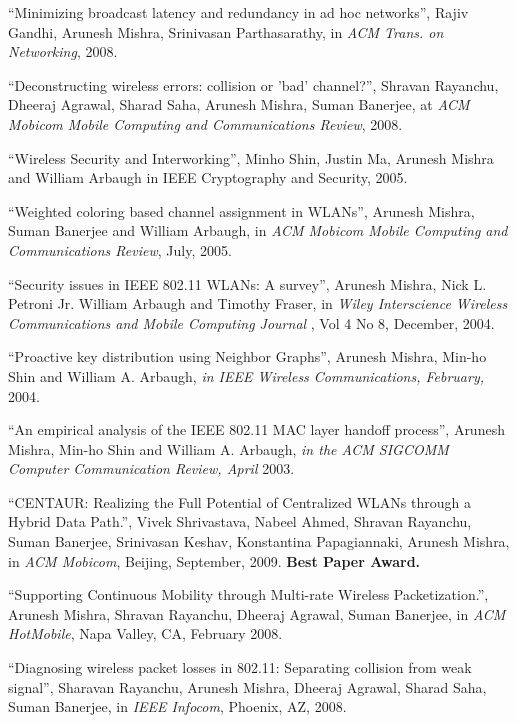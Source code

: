 \begin{resume}
\mybullet ``Minimizing broadcast latency and redundancy in ad hoc networks'', Rajiv Gandhi, Arunesh Mishra, Srinivasan Parthasarathy, in
{\em ACM Trans. on Networking}, 2008.

\mybullet ``Deconstructing wireless errors: collision or 'bad' channel?'', Shravan  Rayanchu, Dheeraj Agrawal, Sharad Saha, Arunesh Mishra, Suman Banerjee,
at {\em ACM Mobicom Mobile Computing and Communications Review}, 2008.

\mybullet ``Wireless Security and Interworking'', Minho Shin, Justin Ma, Arunesh Mishra and William Arbaugh in IEEE Cryptography and Security, 2005.

\mybullet ``Weighted coloring based channel assignment in WLANs'', Arunesh Mishra, Suman Banerjee and William Arbaugh,
in {\em ACM Mobicom Mobile Computing and Communications Review}, July, 2005.

\mybullet ``Security issues in IEEE 802.11 WLANs: A survey'', Arunesh Mishra, Nick L. Petroni Jr. William Arbaugh and Timothy Fraser, 
in {\em  Wiley Interscience Wireless Communications and Mobile Computing Journal }, Vol 4 No 8, December, 2004.

\mybullet ``Proactive key distribution using Neighbor Graphs'', Arunesh Mishra,  Min-ho Shin and William A. Arbaugh,
{\em in IEEE Wireless Communications, February,} 2004.

\mybullet ``An empirical analysis of the IEEE 802.11 MAC layer handoff process'', Arunesh Mishra,  
Min-ho Shin and William A. Arbaugh, {\em in the ACM SIGCOMM Computer Communication Review, April} 2003. 

\vspace{-0.7cm}

\mybullet ``CENTAUR: Realizing the Full Potential of Centralized WLANs through a Hybrid Data Path.'', Vivek Shrivastava, Nabeel Ahmed, Shravan Rayanchu, Suman Banerjee, Srinivasan Keshav, Konstantina Papagiannaki, Arunesh Mishra,
in {\it ACM Mobicom}, Beijing, September, 2009. {\bf Best Paper Award.}

\mybullet ``Supporting Continuous Mobility through Multi-rate Wireless Packetization.'', Arunesh Mishra, Shravan Rayanchu, Dheeraj Agrawal, Suman Banerjee, 
in {\it ACM HotMobile}, Napa Valley, CA, February 2008.

\mybullet ``Diagnosing wireless packet losses in 802.11: Separating collision from weak signal'', Sharavan Rayanchu, Arunesh Mishra, Dheeraj Agrawal, Sharad Saha,
Suman Banerjee, in {\it IEEE Infocom}, Phoenix, AZ, 2008.


\end{resume}
